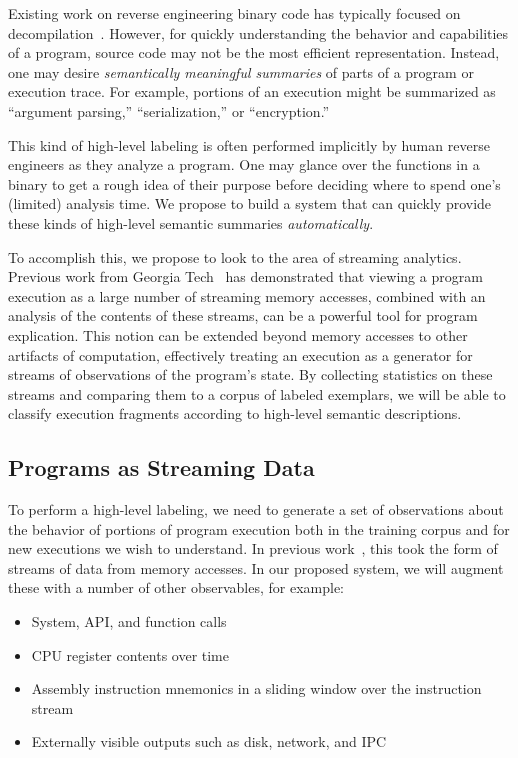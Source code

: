Existing work on reverse engineering binary code has typically focused
on decompilation~\cite{schwartz:2013:decomp,cifuentes:1995:decomp}.
However, for quickly understanding the behavior and capabilities of a
program, source code may not be the most efficient representation.
Instead, one may desire \emph{semantically meaningful summaries} of
parts of a program or execution trace. For example, portions of an
execution might be summarized as ``argument parsing,''
``serialization,'' or ``encryption.''

This kind of high-level labeling is often performed implicitly by human
reverse engineers as they analyze a program. One may glance over the
functions in a binary to get a rough idea of their purpose before
deciding where to spend one's (limited) analysis time. We propose to
build a system that can quickly provide these kinds of high-level
semantic summaries \emph{automatically}.

To accomplish this, we propose to look to the area of streaming
analytics. Previous work from Georgia Tech~\cite{dolangavitt:2013:tzb}
has demonstrated that viewing a program execution as a large number of
streaming memory accesses, combined with an analysis of the contents of
these streams, can be a powerful tool for program explication. This
notion can be extended beyond memory accesses to other artifacts of
computation, effectively treating an execution as a generator for
streams of observations of the program's state. By collecting statistics
on these streams and comparing them to a corpus of labeled exemplars, we
will be able to classify execution fragments according to high-level
semantic descriptions.

\subsection{Programs as Streaming Data}

To perform a high-level labeling, we need to generate a set of
observations about the behavior of portions of program execution both in
the training corpus and for new executions we wish to understand. In
previous work~\cite{dolangavitt:2013:tzb}, this took the form of streams
of data from memory accesses. In our proposed system, we will augment
these with a number of other observables, for example:

\begin{itemize}
    \item System, API, and function calls
    \item CPU register contents over time
    \item Assembly instruction mnemonics in a sliding window over the
    instruction stream
    \item Externally visible outputs such as disk, network, and IPC
\end{itemize}

